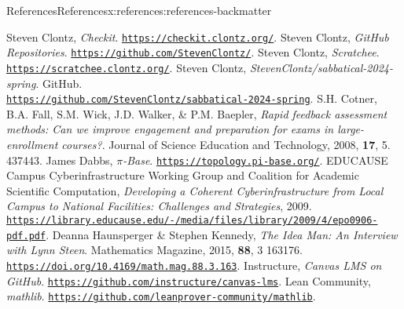 \documentclass[oneside,10pt,]{article}
\begin{document}
\begin{references-section-numberless}{References}{}{References}{}{}{x:references:references-backmatter}
\begin{referencelist}
\hypertarget{x:biblio:biblio-checkit}{}Steven Clontz, \textit{Checkit}. \href{https://checkit.clontz.org/}{\nolinkurl{https://checkit.clontz.org/}}.
\hypertarget{x:biblio:biblio-ghclontz}{}Steven Clontz, \textit{GitHub Repositories}. \href{https://github.com/StevenClontz/}{\nolinkurl{https://github.com/StevenClontz/}}.
\hypertarget{x:biblio:biblio-scratchee}{}Steven Clontz, \textit{Scratchee}. \href{https://scratchee.clontz.org/}{\nolinkurl{https://scratchee.clontz.org/}}.
\hypertarget{x:biblio:biblio-repo}{}Steven Clontz, \textit{StevenClontz\slash{}sabbatical-2024-spring}. GitHub.\\ \href{https://github.com/StevenClontz/sabbatical-2024-spring}{\nolinkurl{https://github.com/StevenClontz/sabbatical-2024-spring}}.
\hypertarget{x:biblio:biblio-ifat}{}S.H. Cotner, B.A. Fall, S.M. Wick, J.D. Walker, \& P.M. Baepler, \textit{Rapid feedback assessment methods: Can we improve engagement and preparation for exams in large-enrollment courses?}. Journal of Science Education and Technology, 2008, \textbf{17}, 5. 437\textendash{}443.
\hypertarget{x:biblio:biblio-pibase}{}James Dabbs, \textit{\(\pi\)-Base}. \href{https://topology.pi-base.org/}{\nolinkurl{https://topology.pi-base.org/}}.
\hypertarget{x:biblio:biblio-cyber-educause}{}EDUCAUSE Campus Cyberinfrastructure Working Group and Coalition for Academic Scientific Computation, \textit{Developing a Coherent Cyberinfrastructure from Local Campus to National Facilities: Challenges and Strategies}, 2009. \href{https://library.educause.edu/-/media/files/library/2009/4/epo0906-pdf.pdf}{\nolinkurl{https://library.educause.edu/-/media/files/library/2009/4/epo0906-pdf.pdf}}.
\hypertarget{x:biblio:biblio-steen}{}Deanna Haunsperger \& Stephen Kennedy, \textit{The Idea Man: An Interview with Lynn Steen}. Mathematics Magazine, 2015, \textbf{88}, 3 163\textendash{}176. \href{https://doi.org/10.4169/math.mag.88.3.163}{\nolinkurl{https://doi.org/10.4169/math.mag.88.3.163}}.
\hypertarget{x:biblio:biblio-canvas}{}Instructure, \textit{Canvas LMS on GitHub}. \href{https://github.com/instructure/canvas-lms}{\nolinkurl{https://github.com/instructure/canvas-lms}}.
\hypertarget{x:biblio:biblio-mathlib}{}Lean Community, \textit{mathlib}. \href{https://github.com/leanprover-community/mathlib}{\nolinkurl{https://github.com/leanprover-community/mathlib}}.

\end{referencelist}
\end{references-section-numberless}
\end{document}
